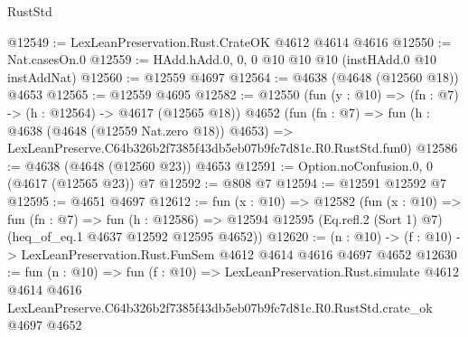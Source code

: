 \begin{lexlean}{RustStd}
\begin{coremodule}
@12549 := LexLeanPreservation.Rust.CrateOK @4612 @4614 @4616
@12550 := Nat.casesOn.{0}
@12559 := HAdd.hAdd.{0, 0, 0} @10 @10 @10 (instHAdd.{0} @10 instAddNat)
@12560 := @12559 @4697
@12564 := @4638 (@4648 (@12560 @18)) @4653
@12565 := @12559 @4695
@12582 := @12550
    (fun (y : @10) => (fn : @7) -> (h : @12564) -> @4617 (@12565 @18))
    @4652
    (fun (fn : @7) =>
    fun (h : @4638 (@4648 (@12559 Nat.zero @18)) @4653) =>
    LexLeanPreserve.C64b326b2f7385f43db5eb07b9fc7d81c.R0.RustStd.fun0)
@12586 := @4638 (@4648 (@12560 @23)) @4653
@12591 := Option.noConfusion.{0, 0} (@4617 (@12565 @23)) @7
@12592 := @808 @7
@12594 := @12591 @12592 @7
@12595 := @4651 @4697
@12612 := fun (x : @10) =>
  @12582
    (fun (x : @10) =>
    fun (fn : @7) =>
    fun (h : @12586) =>
    @12594 @12595 (Eq.refl.{2} (Sort 1) @7) (heq_of_eq.{1} @4637 @12592 @12595 @4652))
@12620 := (n : @10) -> (f : @10) -> LexLeanPreservation.Rust.FunSem @4612 @4614 @4616 @4697 @4652
@12630 := fun (n : @10) =>
  fun (f : @10) =>
  LexLeanPreservation.Rust.simulate
    @4612
    @4614
    @4616
    LexLeanPreserve.C64b326b2f7385f43db5eb07b9fc7d81c.R0.RustStd.crate_ok
    @4697
    @4652
\end{coremodule}
\end{lexlean}

